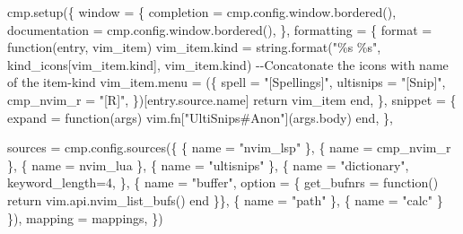 \documentclass[
  letterpaper,
  DIV=11,
  numbers=noendperiod,
  oneside]{scrartcl}
\newenvironment{Shaded}{\begin{snugshade}}{\end{snugshade}}
\newcommand{\ControlFlowTok}[1]{\textcolor[rgb]{0.00,0.23,0.31}{#1}}
\newcommand{\ErrorTok}[1]{\textcolor[rgb]{0.68,0.00,0.00}{#1}}
\newcommand{\ExtensionTok}[1]{\textcolor[rgb]{0.00,0.23,0.31}{#1}}
\newcommand{\FunctionTok}[1]{\textcolor[rgb]{0.28,0.35,0.67}{#1}}
\newcommand{\KeywordTok}[1]{\textcolor[rgb]{0.00,0.23,0.31}{#1}}
\newcommand{\NormalTok}[1]{\textcolor[rgb]{0.00,0.23,0.31}{#1}}
\newcommand{\StringTok}[1]{\textcolor[rgb]{0.13,0.47,0.30}{#1}}
\begin{document}
\begin{Shaded}
\begin{Highlighting}[]
\ExtensionTok{cmp.setup}\ErrorTok{(}\KeywordTok{\{}
\ExtensionTok{window}\NormalTok{ = \{}
    \ExtensionTok{completion}\NormalTok{ = cmp.config.window.bordered}\ErrorTok{(}\KeywordTok{)}\ExtensionTok{,}
    \ExtensionTok{documentation}\NormalTok{ = cmp.config.window.bordered}\ErrorTok{(}\KeywordTok{)}\ExtensionTok{,}
  \ExtensionTok{\},}
\ExtensionTok{formatting}\NormalTok{ = \{}
\ExtensionTok{format}\NormalTok{ = function}\ErrorTok{(}\ExtensionTok{entry,}\NormalTok{ vim\_item}\KeywordTok{)}
      \ExtensionTok{vim\_item.kind}\NormalTok{ = string.format}\ErrorTok{(}\StringTok{"\%s \%s"}\ExtensionTok{,}\NormalTok{ kind\_icons[vim\_item.kind], vim\_item.kind}\KeywordTok{)} \ExtensionTok{{-}{-}Concatonate}\NormalTok{ the icons with name of the item{-}kind}
      \ExtensionTok{vim\_item.menu}\NormalTok{ = }\ErrorTok{(}\KeywordTok{\{}
        \ExtensionTok{spell}\NormalTok{ = }\StringTok{"[Spellings]"}\NormalTok{,}
        \ExtensionTok{ultisnips}\NormalTok{ = }\StringTok{"[Snip]"}\NormalTok{,}
        \ExtensionTok{cmp\_nvim\_r}\NormalTok{ = }\StringTok{"[R]"}\NormalTok{,}
      \KeywordTok{\})}\ExtensionTok{[entry.source.name]}
      \ControlFlowTok{return} \ExtensionTok{vim\_item}
    \ExtensionTok{end,}
    \ExtensionTok{\},}
  \ExtensionTok{snippet}\NormalTok{ = \{}
    \FunctionTok{expand}\NormalTok{ = function}\ErrorTok{(}\ExtensionTok{args}\KeywordTok{)}
      \ExtensionTok{vim.fn[}\StringTok{"UltiSnips\#Anon"}\ExtensionTok{]}\ErrorTok{(}\ExtensionTok{args.body}\KeywordTok{)} 
    \ExtensionTok{end,}
  \ExtensionTok{\},}

\ExtensionTok{sources}\NormalTok{ = cmp.config.sources}\ErrorTok{(}\KeywordTok{\{}
    \KeywordTok{\{} \ExtensionTok{name}\NormalTok{ = }\StringTok{"nvim\_lsp"}\NormalTok{ \},}
    \KeywordTok{\{} \ExtensionTok{name}\NormalTok{ = }\StringTok{\textquotesingle{}cmp\_nvim\_r\textquotesingle{}}\NormalTok{ \},}
    \KeywordTok{\{} \ExtensionTok{name}\NormalTok{ = }\StringTok{\textquotesingle{}nvim\_lua\textquotesingle{}}\NormalTok{ \},}
    \KeywordTok{\{} \ExtensionTok{name}\NormalTok{ = }\StringTok{"ultisnips"}\NormalTok{ \},}
    \KeywordTok{\{} \ExtensionTok{name}\NormalTok{ = }\StringTok{"dictionary"}\NormalTok{, keyword\_length=4, \},}
    \KeywordTok{\{} \ExtensionTok{name}\NormalTok{ = }\StringTok{"buffer"}\NormalTok{, option = \{ get\_bufnrs = function}\ErrorTok{(}\KeywordTok{)}
      \ControlFlowTok{return} \FunctionTok{vim.api.nvim\_list\_bufs()}
    \ExtensionTok{end}
    \ExtensionTok{\}\},}
    \KeywordTok{\{} \ExtensionTok{name}\NormalTok{ = }\StringTok{"path"}\NormalTok{ \},}
    \KeywordTok{\{} \ExtensionTok{name}\NormalTok{ = }\StringTok{"calc"}\NormalTok{ \}}
  \KeywordTok{\}}\ErrorTok{)}\ExtensionTok{,}
  \ExtensionTok{mapping}\NormalTok{ = mappings,}
\KeywordTok{\}}\ErrorTok{)}


\end{Highlighting}
\end{Shaded}
\end{document}
